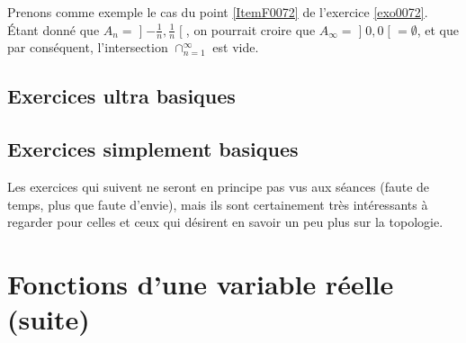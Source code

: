 Prenons comme exemple le cas du point \ref{ItemF0072} de l'exercice \ref{exo0072}. Étant donné que $A_n=\mathopen]-\frac{1}{ n },\frac{1}{ n }\mathclose[$, on pourrait croire que $A_{\infty}=\mathopen]0,0\mathclose[=\emptyset$, et que par conséquent, l'intersection $\cap_{n=1}^{\infty}$ est vide.

					\subsection{Exercices ultra basiques}



					\subsection{Exercices simplement basiques}

Les exercices qui suivent ne seront en principe pas vus aux séances (faute de temps, plus que faute d'envie), mais ils sont certainement très intéressants à regarder pour celles et ceux qui désirent en savoir un peu plus sur la topologie.



					\section{Fonctions d'une variable réelle (suite)}



